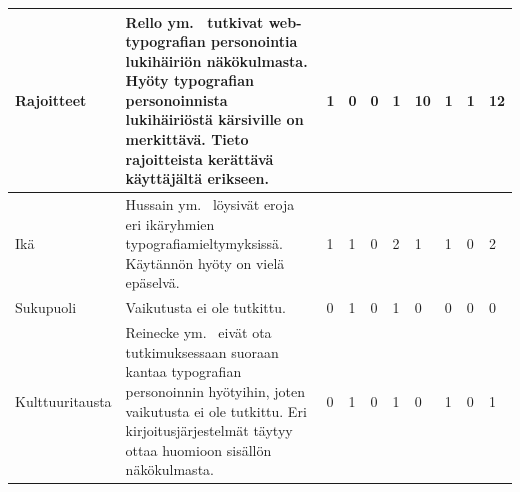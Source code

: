 \documentclass[finnish, 12pt, a4paper, elec, utf8, a-1b]{aaltothesis}
\begin{document}
{\begin{longtable}{p{2.5cm}|p{6cm}|p{0.5cm}p{0.5cm}p{0.5cm}|p{0.5cm}|p{0.5cm}p{0.5cm}p{0.5cm}|p{0.5cm}|}
    \midrule
    Rajoitteet                             & Rello ym.~\cite{10.1145/2207016.2207048} tutkivat web-typografian personointia lukihäiriön näkökulmasta. Hyöty typografian personoinnista lukihäiriöstä kärsiville on merkittävä. Tieto rajoitteista kerättävä käyttäjältä erikseen.                          & 1                                          & 0                                   & 0                                      & 1                            & 10                                              & 1                                         & 1                                         & 12                           \\
    \midrule
    Ikä                                    & Hussain ym.~\cite{hussain_sohaib_ahmed_qasim_khan_2011} löysivät eroja eri ikäryhmien typografiamieltymyksissä. Käytännön hyöty on vielä epäselvä.                                                                                                            & 1                                          & 1                                   & 0                                      & 2                            & 1                                               & 1                                         & 0                                         & 2                            \\
    \midrule
    Sukupuoli                              & Vaikutusta ei ole tutkittu.                                                                                                                                                                                                                                   & 0                                          & 1                                   & 0                                      & 1                            & 0                                               & 0                                         & 0                                         & 0                            \\
    \midrule
    Kulttuuritausta                        & Reinecke ym.~\cite{10.1145/2556288.2557052} eivät ota tutkimuksessaan suoraan kantaa typografian personoinnin hyötyihin, joten vaikutusta ei ole tutkittu. Eri kirjoitusjärjestelmät täytyy ottaa huomioon sisällön näkökulmasta.                             & 0                                          & 1                                   & 0                                      & 1                            & 0                                               & 1                                         & 0                                         & 1                            \\

\end{longtable}}
\end{document}
